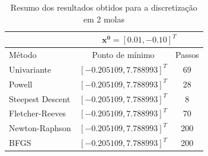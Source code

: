 \documentclass[10pt, a4paper]{article}
\begin{document}
\begin{table}[htpb]
  \centering
  \begin{tabular}{|l|c|c|}
    \cline{2-3}
    \multicolumn{1}{c}{} \vline
    & 
    \multicolumn{2}{c}{$\mathbf{x^0} = [0.01, -0.10]^T$} \vline \\
    \hline%
    Método             &	Ponto de mínimo	          & Passos	\\
    \hline
    Univariante        & $[-0.205109, 7.788993]^T$ & 69      \\
    Powell             & $[-0.205109, 7.788993]^T$ & 28      \\
    Steepest Descent   & $[-0.205109, 7.788993]^T$ & 8       \\
    Fletcher-Reeves    & $[-0.205109, 7.788993]^T$ & 70      \\
    Newton-Raphson     & $[-0.205109, 7.788993]^T$ & 200     \\
    BFGS               & $[-0.205109, 7.788993]^T$ & 200     \\
    \hline
  \end{tabular}
  \caption{Resumo dos resultados obtidos para a discretização em 2 molas}
  \label{tab:q2a_results}
\end{table}
\end{document}
